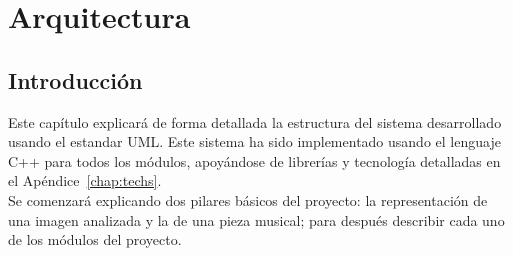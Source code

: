 \chapter{Arquitectura}
\label{chap:arquitectura}

\section{Introducción}

Este capítulo explicará de forma detallada la estructura del sistema desarrollado usando el estandar UML. Este sistema ha sido implementado usando el lenguaje C++ para todos los módulos, apoyándose de librerías y tecnología detalladas en el Apéndice~\ref{chap:techs}.\\

Se comenzará explicando dos pilares básicos del proyecto: la representación de una imagen analizada y la de una pieza musical; para después describir cada uno de los módulos del proyecto.\\




